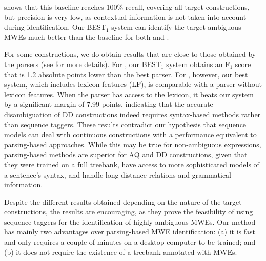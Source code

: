 \documentclass[output=paper,
modfonts
]{langscibook}
\begin{document}
 shows that this baseline reaches 100\% recall, covering all target constructions, but precision is very low, as contextual information is not taken into account during identification.
Our \textsc{BEST$_1$} system can identify the target ambiguous MWEs much better than the baseline for both \fullAQ{} and \fullDD{}.

For some constructions, we do obtain results that are close to those obtained by the parsers (see  for more details). For \fullAQ{}, our \textsc{BEST$_1$} system obtains an F$_1$ score that is 1.2 absolute points lower than the best parser. For \fullDD{}, however, our best system, which includes lexicon features (LF), is comparable with a parser without lexicon features. When the parser has access to the lexicon, it beats our system by a significant margin of 7.99 points, indicating that the accurate disambiguation of DD constructions indeed requires syntax-based methods rather than sequence taggers. These results contradict our hypothesis that sequence models can deal with continuous constructions with a performance equivalent to parsing-based approaches. While this may be true for non-ambiguous expressions, parsing-based methods are superior for AQ and DD constructions, given that they were trained on a full treebank, have access to more sophisticated models of a sentence's syntax, and handle long-distance relations and grammatical information.

Despite the different results obtained depending on the nature of the target constructions, the results are encouraging, as they prove the feasibility of using sequence taggers for the identification of highly ambiguous MWEs. Our method has mainly two advantages over parsing-based MWE identification: (a) it is fast and only requires a couple of minutes on a desktop computer to be trained; and (b) it does not require the existence of a treebank annotated with MWEs.
\end{document}
